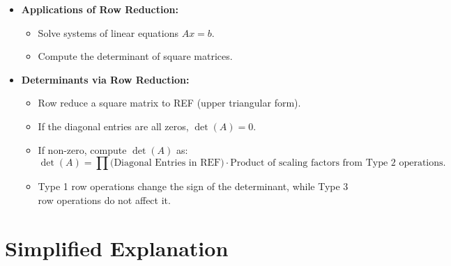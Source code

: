 \documentclass{article}
\begin{document}
\begin{itemize}
  \item \textbf{Applications of Row Reduction:}
    \begin{itemize}
      \item Solve systems of linear equations $Ax = b$.
      \item Compute the determinant of square matrices.
    \end{itemize}

  \item \textbf{Determinants via Row Reduction:}
    \begin{itemize}
      \item Row reduce a square matrix to REF (upper triangular form).
      \item If the diagonal entries are all zeros, $\det(A) = 0$.
      \item If non-zero, compute $\det(A)$ as:
        \[
          \det(A) = \prod \text{(Diagonal Entries in REF)} \cdot \text{Product of scaling factors from Type 2 operations}.
        \]
      \item Type 1 row operations change the sign of the determinant, while Type 3 row operations do not affect it.
    \end{itemize}
\end{itemize}

\section*{Simplified Explanation}
\end{document}
